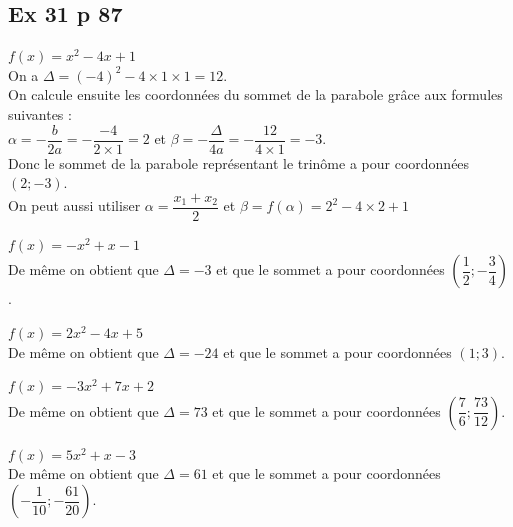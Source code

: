 \documentclass[12pt,a4paper]{book}
\begin{document}
\newpage

\subsection*{Ex 31 p 87}
\begin{enumMet}
    \item $f(x)=x^{2}-4 x+1$\\
    On a $\Delta=(-4)^{2}-4 \times 1 \times 1=12$.\\
    On calcule ensuite les coordonnées du sommet de la parabole grâce aux formules suivantes :\\
    $\alpha=-\dfrac{b}{2 a}=-\dfrac{-4}{2 \times 1}=2$ et $\beta=-\dfrac{\Delta}{4 a}=-\dfrac{12}{4 \times 1}=-3$.\\
    Donc le sommet de la parabole représentant le trinôme a pour coordonnées $(2 ;-3)$.\\
    On peut aussi utiliser $\alpha=\dfrac{x_1+x_2}{2}$ et $\beta=f(\alpha)=2^2-4\times2+1$
    \item $f(x)=-x^{2}+x-1$\\
    De même on obtient que $\Delta=-3$ et que le sommet a pour coordonnées $\left(\dfrac{1}{2} ;-\dfrac{3}{4}\right)$.
    \item $f(x)=2 x^{2}-4 x+5$\\
    De même on obtient que $\Delta=-24$ et que le sommet a pour coordonnées $(1 ; 3)$.
    \item  $f(x)=-3 x^{2}+7 x+2$\\
    De même on obtient que $\Delta=73$ et que le sommet a pour coordonnées $\left(\dfrac{7}{6} ; \dfrac{73}{12}\right)$.
    \item $f(x)=5 x^{2}+x-3$\\
    De même on obtient que $\Delta=61$ et que le sommet a pour coordonnées $\left(-\dfrac{1}{10} ;-\dfrac{61}{20}\right)$.
\end{enumMet}
\end{document}
